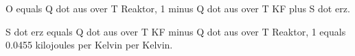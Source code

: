 O equals Q dot aus over T Reaktor, 1 minus Q dot aus over T KF plus S dot erz.

S dot erz equals Q dot aus over T KF minus Q dot aus over T Reaktor, 1 equals 0.0455 kilojoules per Kelvin per Kelvin.
